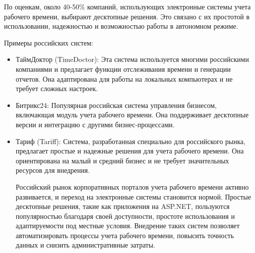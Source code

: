 По оценкам, около 40-50\% компаний, использующих электронные системы учета рабочего времени, выбирают десктопные решения. Это связано с их простотой в использовании, надежностью и возможностью работы в автономном режиме.

Примеры российских систем:

\begin{itemize}
\item ТаймДоктор (TimeDoctor): Эта система используется многими российскими компаниями и предлагает функции отслеживания времени и генерации отчетов. Она адаптирована для работы на локальных компьютерах и не требует сложных настроек.

\item Битрикс24: Популярная российская система управления бизнесом, включающая модуль учета рабочего времени. Она поддерживает десктопные версии и интеграцию с другими бизнес-процессами.

\item Тариф (Tariff): Система, разработанная специально для российского рынка, предлагает простые и надежные решения для учета рабочего времени. Она ориентирована на малый и средний бизнес и не требует значительных ресурсов для внедрения.

Российский рынок корпоративных порталов учета рабочего времени активно развивается, и переход на электронные системы становится нормой. Простые десктопные решения, такие как приложения на ASP.NET, пользуются популярностью благодаря своей доступности, простоте использования и адаптируемости под местные условия. Внедрение таких систем позволяет автоматизировать процессы учета рабочего времени, повысить точность данных и снизить административные затраты.
\end{itemize}